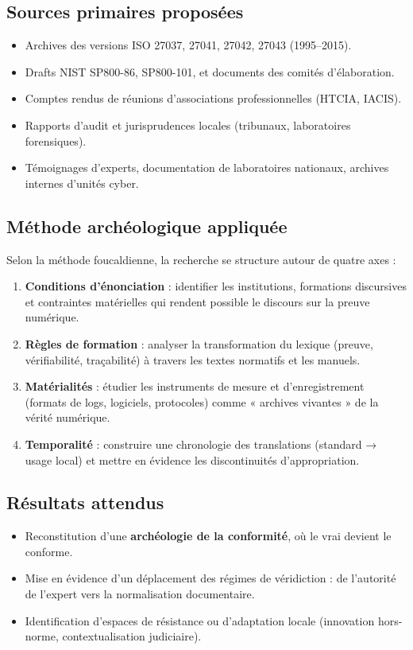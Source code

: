 \documentclass[memoire, 12pt]{report}
\begin{document}
\subsection*{Sources primaires proposées}
\begin{itemize}
  \item Archives des versions ISO 27037, 27041, 27042, 27043 (1995–2015).
  \item Drafts NIST SP800-86, SP800-101, et documents des comités d’élaboration.
  \item Comptes rendus de réunions d’associations professionnelles (HTCIA, IACIS).
  \item Rapports d’audit et jurisprudences locales (tribunaux, laboratoires forensiques).
  \item Témoignages d’experts, documentation de laboratoires nationaux, archives internes d’unités cyber.
\end{itemize}

\subsection*{Méthode archéologique appliquée}
Selon la méthode foucaldienne, la recherche se structure autour de quatre axes :
\begin{enumerate}[label=\textbf{\arabic*.}]
  \item \textbf{Conditions d’énonciation} : identifier les institutions, formations discursives et contraintes matérielles qui rendent possible le discours sur la preuve numérique.
  \item \textbf{Règles de formation} : analyser la transformation du lexique (preuve, vérifiabilité, traçabilité) à travers les textes normatifs et les manuels.
  \item \textbf{Matérialités} : étudier les instruments de mesure et d’enregistrement (formats de logs, logiciels, protocoles) comme « archives vivantes » de la vérité numérique.
  \item \textbf{Temporalité} : construire une chronologie des translations (standard → usage local) et mettre en évidence les discontinuités d’appropriation.
\end{enumerate}

\subsection*{Résultats attendus}
\begin{itemize}
  \item Reconstitution d’une \textbf{archéologie de la conformité}, où le vrai devient le conforme.
  \item Mise en évidence d’un déplacement des régimes de véridiction : de l’autorité de l’expert vers la normalisation documentaire.
  \item Identification d’espaces de résistance ou d’adaptation locale (innovation hors-norme, contextualisation judiciaire).
\end{itemize}
\end{document}

